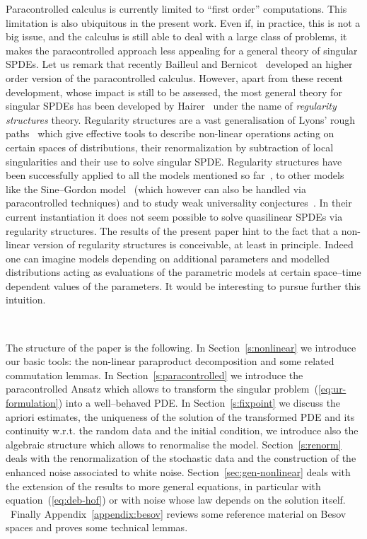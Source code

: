 \documentclass[11pt,reqno]{amsart}
\newcommand{\tmtextit}[1]{{\itshape{#1}}}
\begin{document}
Paracontrolled calculus is currently limited to ``first order'' computations.
This limitation is also ubiquitous in the present work. Even if, in practice,
this is not a big issue, and the calculus is still able to deal with a large
class of problems, it makes the paracontrolled approach less appealing for a
general theory of singular SPDEs. Let us remark that recently Bailleul and
Bernicot~{\cite{bailleul_higher_2016}} developed an higher order version of
the paracontrolled calculus. However, apart from these recent development,
whose impact is still to be assessed, the most general theory for singular
SPDEs has been developed by
Hairer~{\cite{hairer_theory_2014,hairer_singular_2014,friz_course_2014}} under
the name of \tmtextit{regularity structures} theory. Regularity structures are
a vast generalisation of Lyons' rough
paths~{\cite{lyons_differential_1998,lyons_system_2002,lyons_differential_2007}}
which give effective tools to describe non-linear operations acting on certain
spaces of distributions, their renormalization by subtraction of local
singularities and their use to solve singular SPDE. Regularity structures have
been successfully applied to all the models mentioned so
far~{\cite{hairer_theory_2014,hairer_solving_2013}}, to other models like the
Sine--Gordon model~{\cite{hairer_dynamical_2014}} (which however can also be
handled via paracontrolled techniques) and to study weak universality
conjectures~{\cite{hairer_class_2015,hairer_large_2016}}. In their current
instantiation it does not seem possible to solve quasilinear SPDEs via
regularity structures. The results of the present paper hint to the fact that
a non-linear version of regularity structures is conceivable, at least in
principle. Indeed one can imagine models depending on additional parameters
and modelled distributions acting as evaluations of the parametric models at
certain space--time dependent values of the parameters. It would be
interesting to pursue further this intuition.

\

The structure of the paper is the following. In Section~\ref{s:nonlinear} we
introduce our basic tools: the non-linear paraproduct decomposition and some
related commutation lemmas. In Section~\ref{s:paracontrolled} we introduce the
paracontrolled Ansatz which allows to transform the singular
problem~(\ref{eq:ur-formulation}) into a well--behaved PDE. In
Section~\ref{s:fixpoint} we discuss the apriori estimates, the uniqueness of
the solution of the transformed PDE and its continuity w.r.t. the random data
and the initial condition, we introduce also the algebraic structure which
allows to renormalise the model. Section~\ref{s:renorm} deals with the
renormalization of the stochastic data and the construction of the enhanced
noise associated to white noise. Section~\ref{sec:gen-nonlinear} deals with
the extension of the results to more general equations, in particular with
equation~(\ref{eq:deb-hof}) or with noise whose law depends on the solution
itself. \ Finally Appendix~\ref{appendix:besov} reviews some reference
material on Besov spaces and proves some technical lemmas.
\end{document}
